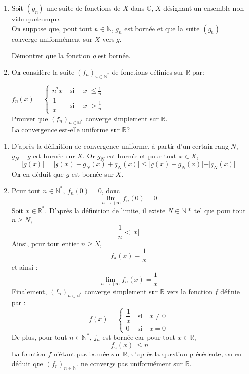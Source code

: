 \documentclass[a4paper,10pt]{report}
\begin{document}
\begin{Exercice}{} 
\begin{enumerate}

\item Soit $(g_n)$ une suite de fonctions de $X$ dans $\mathbb{C}$, $X$ désignant un ensemble non vide quelconque.\\
 On suppose que, pout tout $n\in \mathbb{N}$, $g_n$ est bornée et que la suite $(g_n)$ converge uniformément sur $X$ vers $g$.

Démontrer que la fonction  $g$ est bornée.
\item
On considère la suite  $(f_n)_{n\in\mathbb{N}^*}$ de fonctions  définies sur $\mathbb{R}$ par:\\
\medskip

$f_n(x)=\left\lbrace \begin{array}{lll}
n^2x&\:\text{si}\:&|x|\leqslant \frac{1}{n}\\
\dfrac{1}{x}&\:\text{si}\:&|x|>\frac{1}{n}
\end{array}\right. $\\
Prouver que $(f_n)_{n\in\mathbb{N}^*}$  converge simplement sur $\mathbb{R}$.\\
La convergence est-elle uniforme sur $\mathbb{R}$?\\

\end{enumerate}
\end{Exercice}

\corr \begin{enumerate}

\item D'après la définition de convergence uniforme, à partir d'un certain rang $N$, $g_N-g$ est bornée sur $X$. Or $g_N$ est bornée et pour tout $x \in X$,
$$ \vert g(x) \vert = \vert g(x)-g_N(x) + g_N(x) \vert \leq \vert g(x)-g_N(x) \vert + \vert g_N(x) \vert $$
On en déduit que $g$ est bornée sur $X$.
\item Pour tout $n\in\mathbb{N}^*$, $f_n(0)=0$, donc 
$$\lim\limits_{n\to +\infty}f_n(0)=0$$
Soit $x\in\mathbb{R}^*$. D'après la définition de limite, il existe $N \in \mathbb{N}*$ tel que pour tout $n \geq N$,
$$ \dfrac{1}{n}<|x|$$
Ainsi, pour tout entier $n \geq N$,
$$ f_n(x)=\dfrac{1}{x}$$
et ainsi :
$$\lim\limits_{n\to +\infty}^{}f_n(x)=\dfrac{1}{x}$$
Finalement, $(f_n)_{n\in\mathbb{N}^*}$  converge simplement sur $\mathbb{R}$ vers la fonction $f$ définie par :
$$f(x)=\left\lbrace \begin{array}{lll}
\dfrac{1}{x}&\:\text{si}\:&x\neq 0\\
0&\:\text{si}\:&x=0
\end{array}\right. $$
De plus, pour tout $n\in\mathbb{N}^*$, $f_n$ est bornée car pour tout $x \in \mathbb{R}$,
$$|f_n(x)|\leqslant n$$
La fonction $f$ n'étant pas bornée sur $\mathbb{R}$, d'après la question précédente,  on en déduit que $(f_n)_{n\in\mathbb{N}^*}$  ne converge pas uniformément sur $\mathbb{R}$.
\end{enumerate}
\end{document}
